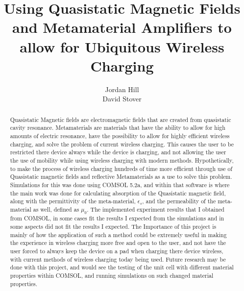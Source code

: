\documentclass[]{article}
\title{Using Quasistatic Magnetic Fields and Metamaterial Amplifiers to allow for Ubiquitous Wireless Charging}
\author{Jordan Hill \\ David Stover}
\begin{document}
\maketitle
\pagebreak

\begin{abstract}
Quasistatic Magnetic fields are electromagnetic fields that are created from quasistatic cavity resonance. Metamaterials are materials that have the ability to allow for high amounts of electric resonance, have the possibility to allow for highly efficient wireless charging, and solve the problem of current wireless charging. This causes the user to be restricted there device always while the device is charging, and not allowing the user the use of mobility while using wireless charging with modern methods. Hypothetically, to make the process of wireless charging hundreds of time more efficient through use of Quasistatic magnetic fields and reflective Metamaterials as a use to solve this problem. Simulations for this was done using COMSOL 5.2a, and within that software is where the main work was done for calculating absorption of the Quasistatic magnetic field, along with the permittivity of the meta-material, $\epsilon_s$, and the permeability of the meta-material as well, defined as $\mu_0$. The implemented experiment results that I obtained from COMSOL, in some cases fit the results I expected from the simulations and in some aspects did not fit the results I expected. The Importance of this project is mainly of how the application of such a method could be extremely useful in making the experience in wireless charging more free and open to the user, and not have the user forced to always keep the device on a pad when charging there device wireless, with current methods of wireless charging today being used. Future research may be done with this project, and would see the testing of the unit cell with different material properties within COMSOL, and running simulations on such changed material properties.
\end{abstract}

\pagebreak
\end{document}
